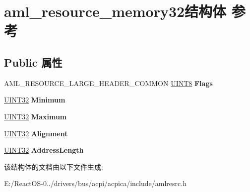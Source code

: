 \hypertarget{structaml__resource__memory32}{}\section{aml\+\_\+resource\+\_\+memory32结构体 参考}
\label{structaml__resource__memory32}
\subsection*{Public 属性}
\begin{DoxyCompactItemize}
\item 
\mbox{\label{structaml__resource__memory32_ab0f1ccaa8e587d820c0d8778c848238c}} 
A\+M\+L\+\_\+\+R\+E\+S\+O\+U\+R\+C\+E\+\_\+\+L\+A\+R\+G\+E\+\_\+\+H\+E\+A\+D\+E\+R\+\_\+\+C\+O\+M\+M\+ON \hyperlink{_processor_bind_8h_ab27e9918b538ce9d8ca692479b375b6a}{U\+I\+N\+T8} {\bfseries Flags}
\item 
\mbox{\label{structaml__resource__memory32_a0d267c228932ef2f62700a726ba5b43b}} 
\hyperlink{_processor_bind_8h_ae1e6edbbc26d6fbc71a90190d0266018}{U\+I\+N\+T32} {\bfseries Minimum}
\item 
\mbox{\label{structaml__resource__memory32_a7c4cb1db1a60b181b70ad3ab81d93b04}} 
\hyperlink{_processor_bind_8h_ae1e6edbbc26d6fbc71a90190d0266018}{U\+I\+N\+T32} {\bfseries Maximum}
\item 
\mbox{\label{structaml__resource__memory32_a4d5d33b1e9b41ce482a3655dcf2ebdce}} 
\hyperlink{_processor_bind_8h_ae1e6edbbc26d6fbc71a90190d0266018}{U\+I\+N\+T32} {\bfseries Alignment}
\item 
\mbox{\label{structaml__resource__memory32_afd0bf25da1c0902d5de642eb0351c511}} 
\hyperlink{_processor_bind_8h_ae1e6edbbc26d6fbc71a90190d0266018}{U\+I\+N\+T32} {\bfseries Address\+Length}
\end{DoxyCompactItemize}


该结构体的文档由以下文件生成\+:\begin{DoxyCompactItemize}
\item 
E\+:/\+React\+O\+S-\/0../drivers/bus/acpi/acpica/include/amlresrc.\+h\end{DoxyCompactItemize}
